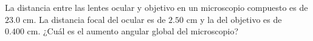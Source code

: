 \item La distancia entre las lentes ocular y objetivo en un microscopio compuesto es de $23.0\text{ cm}$. La distancia focal del ocular es de $2.50\text{ cm}$ y la del objetivo es de $0.400\text{ cm}$. ¿Cuál es el aumento angular global del microscopio?